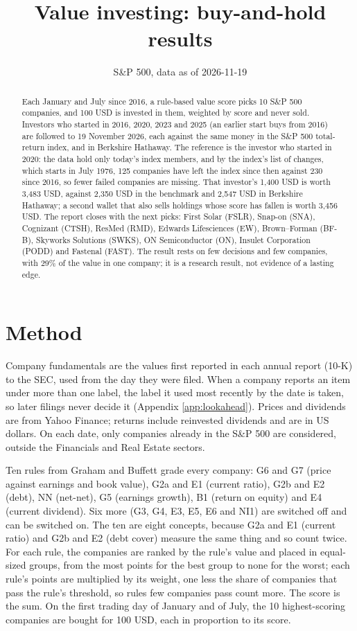 \documentclass[11pt,a4paper]{article}
\title{Value investing: buy-and-hold results}
\author{S\&P 500, data as of 2026-11-19}
\date{}
\begin{document}
\maketitle
\begin{abstract}
Each January and July since 2016, a rule-based value score picks 10 S\&P 500 companies, and 100 USD is invested in them, weighted by score and never sold. Investors who started in 2016, 2020, 2023 and 2025 (an earlier start buys from 2016) are followed to 19 November 2026, each against the same money in the S\&P 500 total-return index, and in Berkshire Hathaway. The reference is the investor who started in 2020: the data hold only today's index members, and by the index's list of changes, which starts in July 1976, 125 companies have left the index since then against 230 since 2016, so fewer failed companies are missing. That investor's 1,400 USD is worth 3,483 USD, against 2,350 USD in the benchmark and 2,547 USD in Berkshire Hathaway; a second wallet that also sells holdings whose score has fallen is worth 3,456 USD. The report closes with the next picks: First Solar (FSLR), Snap-on (SNA), Cognizant (CTSH), ResMed (RMD), Edwards Lifesciences (EW), Brown–Forman (BF-B), Skyworks Solutions (SWKS), ON Semiconductor (ON), Insulet Corporation (PODD) and Fastenal (FAST). The result rests on few decisions and few companies, with 29\% of the value in one company; it is a research result, not evidence of a lasting edge.
\end{abstract}
\section{Method}
Company fundamentals are the values first reported in each annual report (10-K) to the SEC, used from the day they were filed. When a company reports an item under more than one label, the label it used most recently by the date is taken, so later filings never decide it (Appendix \ref{app:lookahead}). Prices and dividends are from Yahoo Finance; returns include reinvested dividends and are in US dollars. On each date, only companies already in the S\&P 500 are considered, outside the Financials and Real Estate sectors.

Ten rules from Graham and Buffett grade every company: G6 and G7 (price against earnings and book value), G2a and E1 (current ratio), G2b and E2 (debt), NN (net-net), G5 (earnings growth), B1 (return on equity) and E4 (current dividend). Six more (G3, G4, E3, E5, E6 and NI1) are switched off and can be switched on. The ten are eight concepts, because G2a and E1 (current ratio) and G2b and E2 (debt cover) measure the same thing and so count twice. For each rule, the companies are ranked by the rule's value and placed in equal-sized groups, from the most points for the best group to none for the worst; each rule's points are multiplied by its weight, one less the share of companies that pass the rule's threshold, so rules few companies pass count more. The score is the sum. On the first trading day of January and of July, the 10 highest-scoring companies are bought for 100 USD, each in proportion to its score.
\end{document}
